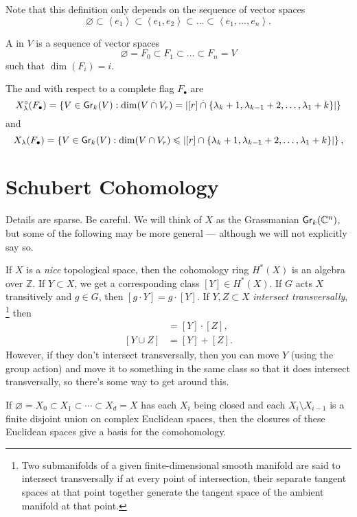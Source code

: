 Note that this definition only depends on the sequence of vector spaces
\begin{equation}
    \varnothing \subset \left\langle e_1 \right\rangle \subset \left\langle e_1, e_2 \right\rangle \subset \ldots \subset \left\langle e_1, \ldots, e_n \right\rangle.
\end{equation}

\begin{definition}
    A  in \(V\) is a sequence of vector spaces
    \begin{equation}
        \varnothing = F_0 \subset F_1 \subset \ldots \subset F_n = V
    \end{equation}
    such that \(\dim(F_i) = i\).
    \end{definition}

The  and  with respect to a complete flag \(F_{\bullet}\) are 
\begin{equation}
    X^{\circ}_{\lambda}(F_{\bullet}) =
    \left\{ V \in \operatorname{\mathsf{Gr}}_k(V) : \dim(V \cap V_r) = \left|[r] \cap \{ \lambda_k + 1, \lambda_{k-1} + 2, \ldots, \lambda_1 + k \} \right| \right\}
\end{equation}
and
\begin{equation}
    X_{\lambda}(F_{\bullet}) =
    \left\{ V \in \operatorname{\mathsf{Gr}}_k(V) : \dim(V \cap V_r) \leqslant \left|[r] \cap \{ \lambda_k + 1, \lambda_{k-1} + 2, \ldots, \lambda_1 + k \} \right| \right\},
\end{equation}

\section{Schubert Cohomology}

Details are sparse.
Be careful.
We will think of \(X\) as the Grassmanian \(\operatorname{\mathsf{Gr}}_k(\mathbb{C}^n)\),
but some of the following may be more general --- although we will not explicitly say so.

If \(X\) is a \emph{nice} topological space,
then the cohomology ring \(H^*(X)\) is an algebra over \(\mathbb{Z}\).
If \(Y \subset X\),
we get a corresponding class \([Y] \in H^*(X)\).
If \(G\) acts \(X\) transitively and \(g \in G\),
then \([g \cdot Y] = g \cdot [Y]\).
If \(Y, Z \subset X\) \emph{intersect transversally},%
\footnote{Two submanifolds of a given finite-dimensional smooth manifold are said to intersect transversally if at every point of intersection, their separate tangent spaces at that point together generate the tangent space of the ambient manifold at that point.}
then
\begin{align}
    [Y \cap Z] &= [Y] \cdot [Z], \\
    [Y \cup Z] &= [Y] + [Z].
\end{align}
However, if they don't intersect transversally, then you can move \(Y\) (using the group action) and move it to something in the same class so that it does intersect transversally, so there's some way to get around this.

If \(\varnothing = X_0 \subset X_1 \subset \cdots \subset X_d = X\) has each \(X_i\) being closed and each \(X_i \setminus X_{i-1}\) is a finite disjoint union on complex Euclidean spaces,
then the closures of these Euclidean spaces give a basis for the comohomology.
